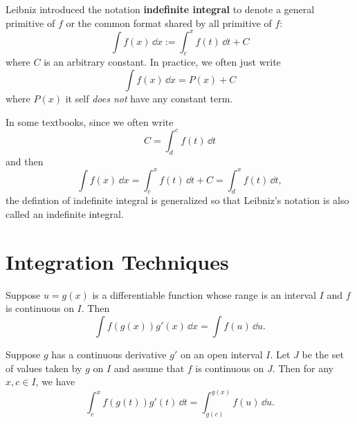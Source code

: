 	\begin{notationenv}
		Leibniz introduced the notation \textbf{indefinite integral} to denote a general primitive of $f$ or the common format shared by all primitive of $f$:
		\[
		\int f(x)\, \dd x := \int_c^x f(t)\, \dd t + C
		\]
		where $C$ is an arbitrary constant. In practice, we often just write
		\[
		\int f(x)\, \dd x = P(x) + C
		\]
		where $P(x)$ it self \emph{does not} have any constant term.
	\end{notationenv}
	\begin{remarkenv}
		In some textbooks, since we often write
		\[
		C=\int_d^c f(t)\, \dd t
		\]
		and then 
		\[
		\int f(x)\, \dd x =\int_c^x f(t)\, \dd t + C = \int_d^x f(t)\, \dd t,
		\]
		the defintion of indefinite integral is generalized so that Leibniz's notation is also called an indefinite integral.
	\end{remarkenv}

	\section{Integration Techniques}
	\begin{methodenv}
		Suppose $u=g(x)$ is a differentiable function whose range is an interval $I$ and $f$ is continuous on $I$. Then
		\[
		\int f(g(x)) g'(x)\, \dd x = \int f(u)\, \dd u.
		\]
	\end{methodenv}
	\begin{theoremenv}
		Suppose $g$ has a continuous derivative $g'$ on an open interval $I$. Let $J$ be the set of values taken by $g$ on $I$ and assume that $f$ is continuous on $J$. Then for any $x,c\in I$, we have
		\[
		\int_c^x f(g(t)) g'(t)\, \dd t = \int_{g(c)}^{g(x)} f(u)\, \dd u.
		\]
	\end{theoremenv}

